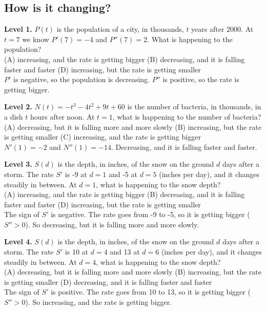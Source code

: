 \documentclass[11pt]{article}
\begin{document}
\subsection*{How is it changing?}
\noindent\textbf{Level 1.} $P(t)$ is the population of a city, in thousands, $t$ years after 2000. At $t=7$ we know $P'(7)=-4$ and $P''(7)=2$. What is happening to the population?\\ (A) increasing, and the rate is getting bigger \quad (B) decreasing, and it is falling faster and faster \quad {} \quad (D) increasing, but the rate is getting smaller\\  \quad $P'$ is negative, so the population is decreasing. $P''$ is positive, so the rate is getting bigger.\par\medskip
\noindent\textbf{Level 2.} $N(t)=-t^{3}-4t^{2}+9t+60$ is the number of bacteria, in thousands, in a dish $t$ hours after noon. At $t=1$, what is happening to the number of bacteria?\\ (A) decreasing, but it is falling more and more slowly \quad (B) increasing, but the rate is getting smaller \quad (C) increasing, and the rate is getting bigger \quad {}\\  \quad $N'(1)=-2$ and $N''(1)=-14$. Decreasing, and it is falling faster and faster.\par\medskip
\noindent\textbf{Level 3.} $S(d)$ is the depth, in inches, of the snow on the ground $d$ days after a storm. The rate $S'$ is -9 at $d=1$ and -5 at $d=5$ (inches per day), and it changes steadily in between. At $d=1$, what is happening to the snow depth?\\ (A) increasing, and the rate is getting bigger \quad (B) decreasing, and it is falling faster and faster \quad {} \quad (D) increasing, but the rate is getting smaller\\  \quad The sign of $S'$ is negative. The rate goes from -9 to -5, so it is getting bigger ($S''>0$). So decreasing, but it is falling more and more slowly.\par\medskip
\noindent\textbf{Level 4.} $S(d)$ is the depth, in inches, of the snow on the ground $d$ days after a storm. The rate $S'$ is 10 at $d=4$ and 13 at $d=6$ (inches per day), and it changes steadily in between. At $d=4$, what is happening to the snow depth?\\ (A) decreasing, but it is falling more and more slowly \quad (B) increasing, but the rate is getting smaller \quad {} \quad (D) decreasing, and it is falling faster and faster\\  \quad The sign of $S'$ is positive. The rate goes from 10 to 13, so it is getting bigger ($S''>0$). So increasing, and the rate is getting bigger.\par\medskip
\end{document}
